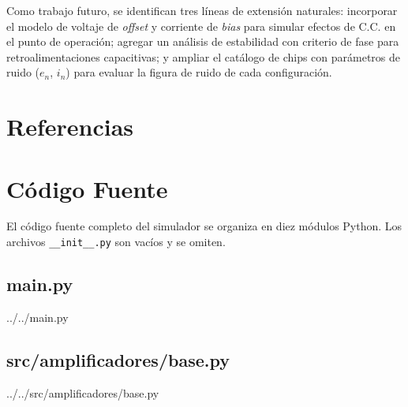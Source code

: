 ﻿\documentclass[12pt, letterpaper]{article}
\begin{document}
Como trabajo futuro, se identifican tres líneas de extensión naturales:
incorporar el modelo de voltaje de \textit{offset} y corriente de \textit{bias}
para simular efectos de C.C. en el punto de operación; agregar un análisis de
estabilidad con criterio de fase para retroalimentaciones capacitivas; y
ampliar el catálogo de chips con parámetros de ruido (\(e_n\), \(i_n\)) para
evaluar la figura de ruido de cada configuración.

\section*{Referencias}
\renewcommand{\refname}{}
\vspace{-2\baselineskip}

\nocite{*}




\appendix
\section{Código Fuente}

El código fuente completo del simulador se organiza en diez módulos Python.
Los archivos \texttt{\_\_init\_\_.py} son vacíos y se omiten.

\subsection*{main.py}

    {../../main.py}

\newpage
\subsection*{src/amplificadores/base.py}

    {../../src/amplificadores/base.py}
\end{document}
